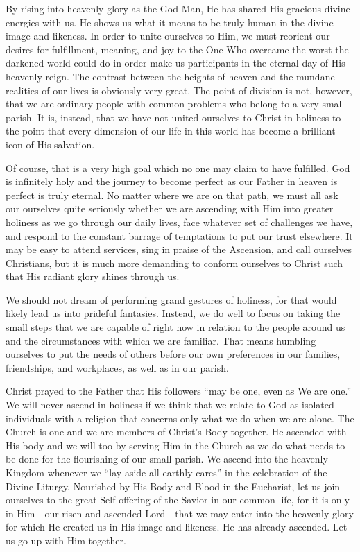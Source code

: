 \documentclass[twoside, letterpaper, 12pt]{report}
\begin{document}
\begin{maybetwocolumns}
By rising into heavenly glory as the God-Man, He has shared His gracious divine energies with
us. He shows us what it means to be truly human in the divine image and likeness. In order to
unite ourselves to Him, we must reorient our desires for fulfillment, meaning, and joy to the One
Who overcame the worst the darkened world could do in order make us participants in the eternal
day of His heavenly reign. The contrast between the heights of heaven and the mundane realities
of our lives is obviously very great. The point of division is not, however, that we are ordinary
people with common problems who belong to a very small parish. It is, instead, that we have not
united ourselves to Christ in holiness to the point that every dimension of our life in this world has
become a brilliant icon of His salvation.

Of course, that is a very high goal which no one may claim to have fulfilled. God is infinitely holy
and the journey to become perfect as our Father in heaven is perfect is truly eternal. No matter
where we are on that path, we must all ask our ourselves quite seriously whether we are ascending
with Him into greater holiness as we go through our daily lives, face whatever set of challenges
we have, and respond to the constant barrage of temptations to put our trust elsewhere. It may be
easy to attend services, sing in praise of the Ascension, and call ourselves Christians, but it is much
more demanding to conform ourselves to Christ such that His radiant glory shines through us.

We should not dream of performing grand gestures of holiness, for that would likely lead us into
prideful fantasies. Instead, we do well to focus on taking the small steps that we are capable of
right now in relation to the people around us and the circumstances with which we are familiar.
That means humbling ourselves to put the needs of others before our own preferences in our
families, friendships, and workplaces, as well as in our parish.

Christ prayed to the Father that His followers “may be one, even as We are one.” We will never
ascend in holiness if we think that we relate to God as isolated individuals with a religion that
concerns only what we do when we are alone. The Church is one and we are members of Christ’s
Body together. He ascended with His body and we will too by serving Him in the Church as we
do what needs to be done for the flourishing of our small parish. We ascend into the heavenly
Kingdom whenever we “lay aside all earthly cares” in the celebration of the Divine Liturgy.
Nourished by His Body and Blood in the Eucharist, let us join ourselves to the great Self-offering
of the Savior in our common life, for it is only in Him—our risen and ascended Lord—that we
may enter into the heavenly glory for which He created us in His image and likeness. He has
already ascended. Let us go up with Him together.
\end{maybetwocolumns}
\end{document}
